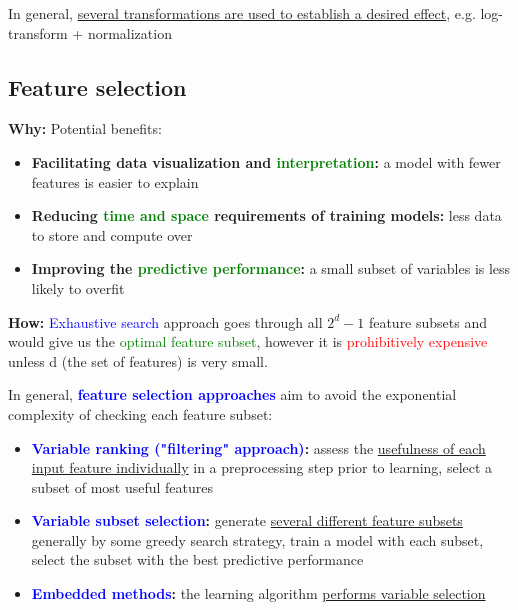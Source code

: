 \documentclass[12pt, a4paper]{article}
\begin{document}
In general, \uline{several transformations are used to establish a desired effect}, e.g. log-transform + normalization








\subsection{Feature selection}\label{feature-selection}


\textbf{Why:} Potential benefits:
\begin{itemize}
  \item \textbf{Facilitating data visualization and \textcolor{Green}{interpretation}:} a model with fewer features is easier to explain
  \item \textbf{Reducing \textcolor{Green}{time and space} requirements of training models:} less data to store and compute over
  \item \textbf{Improving the \textcolor{Green}{predictive performance}:} a small subset of variables is less likely to overfit
\end{itemize}

\textbf{How:} \textcolor{blue}{Exhaustive search} approach goes through all $2^d - 1$ feature subsets and would give us the \textcolor{Green}{optimal feature subset}, however it is \textcolor{red}{prohibitively expensive} unless d (the set of features) is very small.

In general, \textbf{\textcolor{blue}{feature selection approaches}} aim to avoid the exponential complexity of checking each feature subset:

\begin{itemize}
  \item \textbf{\textcolor{blue}{Variable ranking ("filtering" approach)}:} assess the \uline{usefulness of each input feature individually} in a preprocessing step prior to learning, select a subset of most useful features
  \item \textbf{\textcolor{blue}{Variable subset selection}:} generate \uline{several different feature subsets} generally by some greedy search strategy, train a model with each subset, select the subset with the best predictive performance
  \item \textbf{\textcolor{blue}{Embedded methods}:} the learning algorithm \uline{performs variable selection}
\end{itemize}
\end{document}
